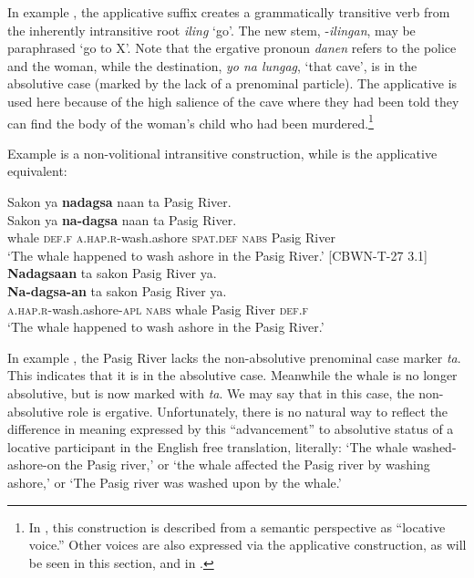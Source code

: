 In example , the applicative suffix creates a grammatically transitive verb from the inherently intransitive root \textit{iling} ‘go’. The new stem, -\textit{ilingan}, may be paraphrased ‘go to X’. Note that the ergative pronoun \textit{danen} refers to the police and the woman, while the destination, \textit{yo na lungag}, ‘that cave’, is in the absolutive case (marked by the lack of a prenominal particle). The applicative is used here because of the high salience of the cave where they had been told they can find the body of the woman’s child who had been murdered.\footnote{In , this construction is described from a semantic perspective as “locative voice.” Other voices are also expressed via the applicative construction, as will be seen in this section, and in .}

Example  is a non-volitional intransitive construction, while  is the applicative equivalent:

\ea
\label{bkm:Ref395170605} 
Sakon  ya  \textbf{nadagsa}  naan  ta  Pasig  River. \\\smallskip
\gll Sakon  ya  \textbf{na-dagsa}  naan  ta  Pasig  River. \\
whale  \textsc{def.f}  \textsc{a.hap.r}-wash.ashore  \textsc{spat.def}  \textsc{nabs}  Pasig  River \\
\glt ‘The whale happened to wash ashore in the Pasig River.’ [CBWN-T-27 3.1]
\z
\ea
\label{bkm:Ref395170609}
\textbf{Nadagsaan}  ta  sakon  Pasig  River  ya. \\\smallskip
\gll \textbf{Na-dagsa-an}  ta  sakon  Pasig  River  ya. \\
\textsc{a.hap.r}-wash.ashore-\textsc{apl}  \textsc{nabs}  whale  Pasig  River  \textsc{def.f} \\
\glt ‘The whale happened to wash ashore in the Pasig River.’
\z

In example , the Pasig River lacks the non-absolutive prenominal case marker \textit{ta}. This indicates that it is in the absolutive case. Meanwhile the whale is no longer absolutive, but is now marked with \textit{ta}. We may say that in this case, the non-absolutive role is ergative. Unfortunately, there is no natural way to reflect the difference in meaning expressed by this “advancement” to absolutive status of a locative participant in the English free translation, literally: `The whale washed-ashore-on the Pasig river,' or `the whale affected the Pasig river by washing ashore,' or `The Pasig river was washed upon by the whale.'

